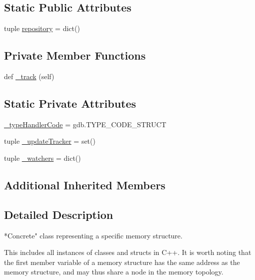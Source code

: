 \subsection*{Static Public Attributes}
\begin{DoxyCompactItemize}
\item 
tuple \hyperlink{classmemoryoracle_1_1instance_1_1StructureInstance_ade530272937d7c23c79635a5741bfc23}{repository} = dict()
\end{DoxyCompactItemize}
\subsection*{Private Member Functions}
\begin{DoxyCompactItemize}
\item 
def \hyperlink{classmemoryoracle_1_1instance_1_1StructureInstance_a972b88ba2dcdc0e5d362d92e740f446d}{\+\_\+track} (self)
\end{DoxyCompactItemize}
\subsection*{Static Private Attributes}
\begin{DoxyCompactItemize}
\item 
\hyperlink{classmemoryoracle_1_1instance_1_1StructureInstance_a51072a5a6d2932e6f06581d1c0356eee}{\+\_\+type\+Handler\+Code} = gdb.\+T\+Y\+P\+E\+\_\+\+C\+O\+D\+E\+\_\+\+S\+T\+R\+U\+C\+T
\item 
tuple \hyperlink{classmemoryoracle_1_1instance_1_1StructureInstance_a022600b9e3e0ff85fdc84d76730a3e85}{\+\_\+update\+Tracker} = set()
\item 
tuple \hyperlink{classmemoryoracle_1_1instance_1_1StructureInstance_a3aa33ca437060ed8c6db969c9cd2bcc6}{\+\_\+watchers} = dict()
\end{DoxyCompactItemize}
\subsection*{Additional Inherited Members}


\subsection{Detailed Description}
\begin{DoxyVerb}*Concrete" class representing a specific memory structure.

This includes all instances of classes and structs in C++.
It is worth noting that the first member variable of a
memory structure has the same address as the memory structure,
and may thus share a node in the memory topology.
\end{DoxyVerb}
 

